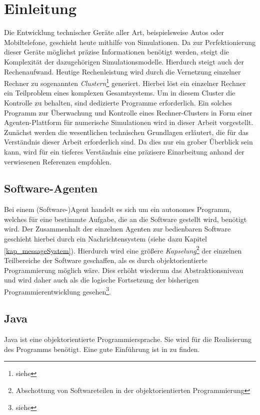 \documentclass[a4paper,12pt,oneside,openright,onecolumn,final,titlepage,fleqn,ngerman]{scrreprt}
\begin{document}
	\chapter{Einleitung}
	Die Entwicklung technischer Geräte aller Art, beispielsweise Autos oder Mobiltelefone, geschieht heute mithilfe von Simulationen. Da zur Perfektionierung dieser Geräte möglichst präzise Informationen benötigt werden, steigt die Komplexität der dazugehörigen Simulationsmodelle. Hierdurch steigt auch der Rechenaufwand. Heutige Rechenleistung wird durch die Vernetzung einzelner Rechner zu sogenannten \emph{Clustern}\footnote{siehe } generiert. Hierbei löst ein einzelner Rechner ein Teilproblem eines komplexen Gesamtsystems. Um in diesem Cluster die Kontrolle zu behalten, sind dedizierte Programme erforderlich. Ein solches Programm zur Überwachung und Kontrolle eines Rechner-Clusters in Form einer Agenten-Plattform für numerische Simulationen wird in dieser Arbeit vorgestellt. Zunächst werden die wesentlichen technischen Grundlagen erläutert, die für das Verständnis dieser Arbeit erforderlich sind. Da dies nur ein grober Über\-blick sein kann, wird für ein tieferes Verständnis eine präzisere Einarbeitung anhand der verwiesenen Referenzen empfohlen.
	
	\section{Software-Agenten}
	Bei einem (Software-)Agent handelt es sich um ein autonomes Programm, welches für eine bestimmte Aufgabe, die an die Software gestellt wird, benötigt wird. Der Zusammenhalt der einzelnen Agenten zur bedienbaren Software geschieht hierbei durch ein Nachrichtensystem (siehe dazu Kapitel \ref{kap_messageSystem}). Hierdurch wird eine größere \emph{Kapselung}\footnote{Abschottung von Softwareteilen in der objektorientierten Programmierung} der einzelnen Teilbereiche der Software geschaffen, als es durch objektorientierte Programmierung möglich wäre. Dies erhöht wiederum das Abstraktionsniveau und wird daher auch als die logische Fortsetzung der bisherigen Programmierentwicklung gesehen\footnote{siehe }.
	
	\section{Java}
	Java ist eine objektorientierte Programmiersprache. Sie wird für die Realisierung des Programms benötigt. Eine gute Einführung ist in  zu finden.
	
\end{document}
